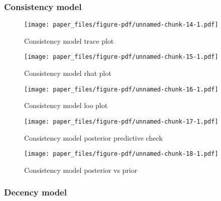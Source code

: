 \documentclass[
  letterpaper,
  DIV=11,
  numbers=noendperiod]{scrartcl}
\begin{document}
\hypertarget{consistency-model}{%
\subsubsection{Consistency model}\label{consistency-model}}

\begin{figure}

{\centering \texttt{[image: paper\_files/figure-pdf/unnamed-chunk-14-1.pdf]}

}

\caption{Consistency model trace plot}

\end{figure}

\begin{figure}

{\centering \texttt{[image: paper\_files/figure-pdf/unnamed-chunk-15-1.pdf]}

}

\caption{Consistency model rhat plot}

\end{figure}

\begin{figure}

{\centering \texttt{[image: paper\_files/figure-pdf/unnamed-chunk-16-1.pdf]}

}

\caption{Consistency model loo plot}

\end{figure}

\begin{figure}

{\centering \texttt{[image: paper\_files/figure-pdf/unnamed-chunk-17-1.pdf]}

}

\caption{Consistency model posterior predictive check}

\end{figure}

\begin{figure}

{\centering \texttt{[image: paper\_files/figure-pdf/unnamed-chunk-18-1.pdf]}

}

\caption{Consistency model posterior vs prior}

\end{figure}

\newpage

\hypertarget{decency-model}{%
\subsubsection{Decency model}\label{decency-model}}
\end{document}
